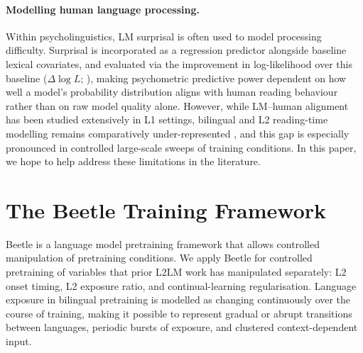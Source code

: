 \documentclass[11pt]{article}
\newcommand{\beetle}{Beetle} %
\begin{document}


\paragraph{Modelling human language processing.} Within psycholinguistics, LM surprisal is often used to model processing difficulty. Surprisal is incorporated as a regression predictor alongside baseline lexical covariates, and evaluated via the improvement in log-likelihood over this baseline ($\Delta\log L$; \citealp{smith2013effect,wilcox2020predictive,oh2022comparison,de-varda-marelli-2023-scaling}), making psychometric predictive power dependent on how well a model’s probability distribution aligns with human reading behaviour rather than on raw model quality alone. However, while LM–human alignment has been studied extensively in L1 settings, bilingual and L2 reading-time modelling remains comparatively under-represented \citep{frank2014modelling,de-varda-marelli-2022-effects, aoyama2024modeling}, and this gap is especially pronounced in controlled large-scale sweeps of training conditions. In this paper, we hope to help address these limitations in the literature.


\section{The \beetle{} Training Framework}\label{sec:framework}

\beetle{} is a language model pretraining framework that  allows controlled manipulation of pretraining conditions. We apply \beetle{} for controlled pretraining of variables that prior L2LM work has manipulated separately: L2 onset timing, L2 exposure ratio, and continual-learning regularisation. Language exposure in bilingual pretraining is modelled as changing continuously over the course of training, making it possible to represent gradual or abrupt transitions between languages, periodic bursts of exposure, and clustered context-dependent input.
\end{document}
